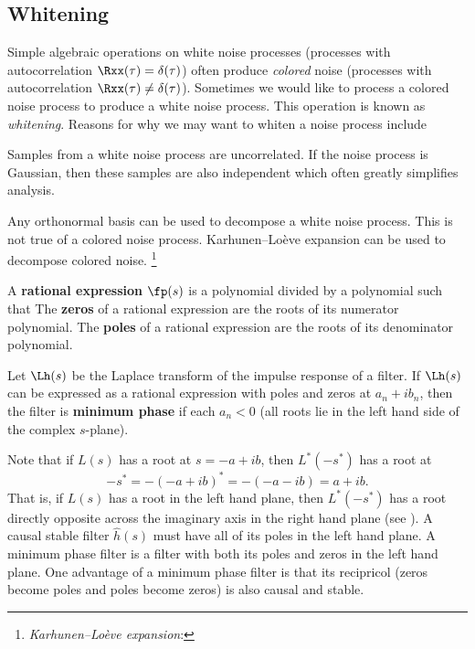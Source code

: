 \subsection{Whitening}
\label{sec:whiten}
Simple algebraic operations on white noise processes
(processes with autocorrelation $\Rxx(\tau)=\delta(\tau)$)
often produce {\em colored} noise
(processes with autocorrelation $\Rxx(\tau)\ne\delta(\tau)$).
Sometimes we would like to process a colored noise process
to produce a white noise process.
This operation is known as {\em whitening}.
Reasons for why we may want to whiten a noise process include
\begin{enume}
   \item Samples from a white noise process are uncorrelated.
         If the noise process is Gaussian, then these samples
         are also independent which often greatly simplifies analysis.
   \item Any orthonormal basis can be used to decompose a white noise process.
         This is not true of a colored noise process.
         Karhunen--Lo\`eve expansion can be used to decompose colored noise.
         \footnote{{\em Karhunen--Lo\`eve expansion}: }
\end{enume}

\begin{definition}
A \textbf{rational expression} $\fp(s)$ is a polynomial divided by a polynomial
such that
The \textbf{zeros} of a rational expression are the roots of its numerator polynomial.
The \textbf{poles} of a rational expression are the roots of its denominator polynomial.
\end{definition}

\begin{definition}
Let $\Lh(s)$ be the Laplace transform of the impulse response of a filter.
If $\Lh(s)$ can be expressed as a rational expression with poles and zeros at
$a_n + ib_n$,
then the filter is \textbf{minimum phase} if each $a_n<0$
(all roots lie in the left hand side of the complex $s$-plane).
\end{definition}

Note that if $L(s)$ has a root at $s=-a+ib$, then
$L^\ast(-s^\ast)$ has a root at
  \[  -s^\ast = -(-a+ib)^\ast = -(-a-ib) = a+ib.   \]
That is, if $L(s)$ has a root in the left hand plane,
then $L^\ast(-s^\ast)$ has a root directly opposite across the imaginary
axis in the right hand plane (see ).
A causal stable filter $\hat{h}(s)$ must have all of its poles in the
left hand plane.
A minimum phase filter is a filter with both its poles and zeros in the
left hand plane.
One advantage of a minimum phase filter is that its recipricol
(zeros become poles and poles become zeros)
is also causal and stable.

